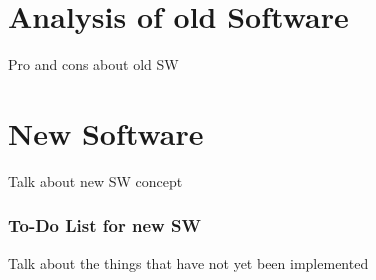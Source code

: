 %
\section{Analysis of old Software}%
%
Pro and cons about old SW
%
\section{New Software}%
%
Talk about new SW concept
%
\subsubsection{To-Do List for new SW}%
%
Talk about the things that have not yet been implemented